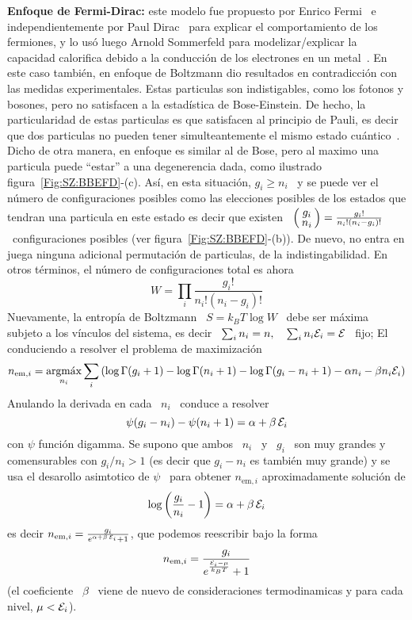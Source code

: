 {\begin{ejemplo}
  {\bf  Enfoque   de  Fermi-Dirac:}  este   modelo  fue  propuesto   por  Enrico
  Fermi~\cite{Fer26, Fer26:2}  e independientemente por  Paul Dirac~\cite{Dir26}
  para  explicar el comportamiento  de los  fermiones, y  lo us\'o  luego Arnold
  Sommerfeld  para  modelizar/explicar  la  capacidad  calorifica  debido  a  la
  conducci\'on  de  los  electrones  en  un metal~\cite{Som27}.   En  este  caso
  tambi\'en, en enfoque  de Boltzmann dio resultados en  contradicci\'on con las
  medidas experimentales.  Estas particulas  son indistigables, como los fotonos
  y bosones, pero no satisfacen  a la estad\'istica de Bose-Einstein.  De hecho,
  la particularidad de estas particulas es que satisfacen al principio de Pauli,
  es decir que  dos particulas no pueden tener  simulteantemente el mismo estado
  cu\'antico~\cite[Cap.~3]{Mer18}. Dicho  de otra manera, en  enfoque es similar
  al de  Bose, pero al maximo  una particula puede ``estar''  a una degenerencia
  dada,   como   ilustrado   figura~\ref{Fig:SZ:BBEFD}-(c).   As\'i,   en   esta
  situaci\'on, $g_i  \ge n_i$ \  y se puede  ver el n\'umero  de configuraciones
  posibles como las elecciones posibles de los estados que tendran una particula
  en  este estado  es decir  que existen  \ $\bino{g_i}{n_i}  = \frac{g_i!}{n_i!
    (n_i-g_i)!}$ \ configuraciones posibles (ver figura~\ref{Fig:SZ:BBEFD}-(b)).
  De nuevo, no entra en  juega ninguna adicional permutaci\'on de particulas, de
  la  indistingabilidad. En  otros  t\'erminos, el  n\'umero de  configuraciones
  total es ahora
  \[
  W = \prod_i \frac{g_i!}{n_i! (n_i - g_i)!}
  \]
  Nuevamente,  la entrop\'ia  de Boltzmann  \ $S  =  k_B T  \log W$  \ debe  ser
  m\'axima subjeto  a los v\'inculos  del sistema, es  decir \ $\sum_i n_i  = n,
  \quad \sum_i n_i \mathcal{E}_i  = \mathcal{E}$ \ fijo; El conduciendo a  resolver el problema de
  maximizaci\'on
  \[
  n_{\mathrm{em},i} = \operatorname*{argm\acute{a}x}_{n_i}  \sum_i \left( \log \Gamma(g_i + 1)  - \log \Gamma(n_i +
    1) - \log \Gamma(g_i - n_i + 1) - \alpha n_i - \beta n_i \mathcal{E}_i \right)
  \]
  Anulando la derivada en cada \ $n_i$ \ conduce a resolver
  \[
  \psi(g_i - n_i) - \psi(n_i+1) = \alpha + \beta \, \mathcal{E}_i
  \]
  con $\psi$ funci\'on digamma.   Se supono que ambos \ $n_i$ \  y \ $g_i$ \ son
  muy  grandes y  comensurables con  $g_i/n_i >  1$ (es  decir que  $g_i-n_i$ es
  tambi\'en   muy    grande)   y   se    usa   el   desarollo    asimtotico   de
  $\psi$~\cite[6.3.18]{AbrSte70} para obtener $n_{\mathrm{em},i}$ aproximadamente soluci\'on
  de
  \[
  \log\left( \frac{g_i}{n_i} - 1 \right) = \alpha + \beta \, \mathcal{E}_i
  \]
  es decir  $n_{\mathrm{em},i} = \frac{g_i}{e^{\alpha  + \beta \,  \mathcal{E}_i} + 1}$,  que podemos
  reescribir bajo la forma
  \[
  n_{\mathrm{em},i} = \frac{g_i}{e^{\frac{\mathcal{E}_i - \mu}{k_B T}} + 1}
  \]
  (el coeficiente \ $\beta$ \ viene de nuevo de consideraciones termodinamicas y
  para cada nivel, $\mu < \mathcal{E}_i$).  


\end{ejemplo}}
